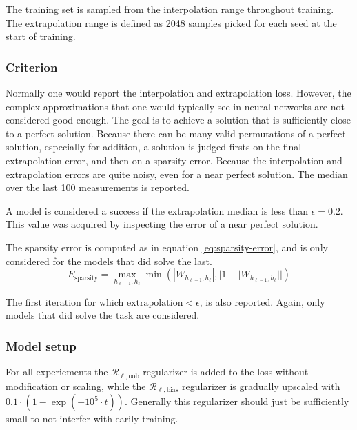The training set is sampled from the interpolation range throughout training. The extrapolation range is defined as 2048 samples picked for each seed at the start of training.

\subsubsection{Criterion}

Normally one would report the interpolation and extrapolation loss. However, the complex approximations that one would typically see in neural networks are not considered good enough. The goal is to achieve a solution that is sufficiently close to a perfect solution. Because there can be many valid permutations of a perfect solution, especially for addition, a solution is judged firsts on the final extrapolation error, and then on a sparsity error.
Because the interpolation and extrapolation errors are quite noisy, even for a near perfect solution. The median over the last 100 measurements is reported.

A model is considered a success if the extrapolation median is less than $\epsilon = 0.2$. This value was acquired by inspecting the error of a near perfect solution. 

The sparsity error is computed as in equation \ref{eq:sparsity-error}, and is only considered for the models that did solve the last.
\begin{equation}
E_\mathrm{sparsity} = \max_{h_{\ell-1}, h_{\ell}} \min(|W_{h_{\ell-1},h_\ell}|, |1 - |W_{h_{\ell-1},h_\ell}||)
\label{eq:sparsity-error}
\end{equation}

The first iteration for which $\mathrm{extrapolation} < \epsilon$, is also reported. Again, only models that did solve the task are considered.

\subsubsection{Model setup}

For all experiements the $\mathcal{R}_{\ell,\mathrm{oob}}$ regularizer is added to the loss without modification or scaling, while the $\mathcal{R}_{\ell,\mathrm{bias}}$ regularizer is gradually upscaled with $0.1 \cdot (1 - \exp(-10^5 \cdot t))$. Generally this regularizer should just be sufficiently small to not interfer with earily training.

